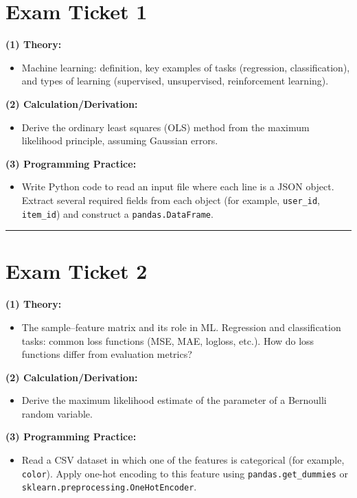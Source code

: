 \documentclass[a4paper,12pt]{article}
\begin{document}
\raggedright

\section*{Exam Ticket 1}
\textbf{(1) Theory:}
\begin{itemize}
  \item Machine learning: definition, key examples of tasks (regression, classification), and types of learning (supervised, unsupervised, reinforcement learning).
\end{itemize}

\textbf{(2) Calculation/Derivation:}
\begin{itemize}
  \item Derive the ordinary least squares (OLS) method from the maximum likelihood principle, assuming Gaussian errors.
\end{itemize}

\textbf{(3) Programming Practice:}
\begin{itemize}
  \item Write Python code to read an input file where each line is a JSON object. Extract several required fields from each object (for example, \texttt{user\_id}, \texttt{item\_id}) and construct a \texttt{pandas.DataFrame}.
\end{itemize}

\noindent\rule{\textwidth}{0.4pt}
\newpage

\section*{Exam Ticket 2}
\textbf{(1) Theory:}
\begin{itemize}
  \item The sample--feature matrix and its role in ML. Regression and classification tasks: common loss functions (MSE, MAE, logloss, etc.). How do loss functions differ from evaluation metrics?
\end{itemize}

\textbf{(2) Calculation/Derivation:}
\begin{itemize}
  \item Derive the maximum likelihood estimate of the parameter of a Bernoulli random variable.
\end{itemize}

\textbf{(3) Programming Practice:}
\begin{itemize}
  \item Read a CSV dataset in which one of the features is categorical (for example, \texttt{color}). Apply one-hot encoding to this feature using \texttt{pandas.get\_dummies} or \texttt{sklearn.preprocessing.OneHotEncoder}.
\end{itemize}
\end{document}
